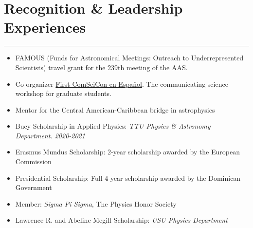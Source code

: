 \documentclass[letterpaper,10pt]{article}
\begin{document}
\section*{Recognition \& Leadership Experiences }       

\hrule
\vspace{.3 cm}

\begin{itemize}[label=$\blacktriangleright$]

\item FAMOUS (Funds for Astronomical Meetings: Outreach to Underrepresented Scientists) travel grant for the 239th meeting of the AAS.

\item Co-organizer \href{https://comscicon.com/comscicon-en-espanol-2021}{First ComSciCon en Espa\~nol}. The communicating science workshop for graduate students.

\item Mentor for the Central American-Caribbean bridge in astrophysics



\item Bucy Scholarship in Applied Physics: \emph{TTU Physics \& Astronomy Department. 2020-2021} %





  \item Erasmus Mundus Scholarship: 2-year scholarship awarded by the European Commission %
\item Presidential Scholarship: Full 4-year scholarship awarded by the Dominican Government %


\item  Member: \emph{Sigma Pi Sigma}, The Physics Honor Society %


\item Lawrence  R. and Abeline Megill Scholarship: \emph{USU Physics Department}   %
  \end{itemize}
\end{document}
